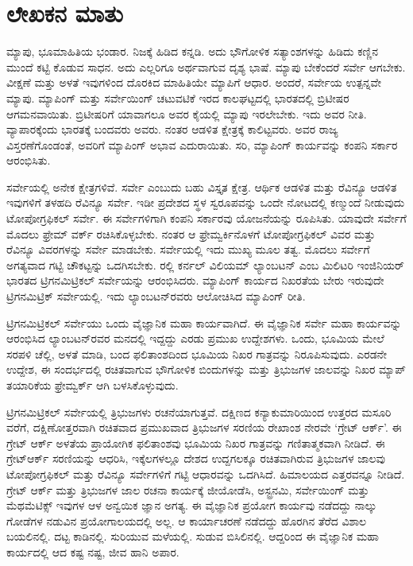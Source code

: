 
\chapter*{ಲೇಖಕನ ಮಾತು}

ಮ್ಯಾಪು, ಭೂಮಾಹಿತಿಯ ಭಂಡಾರ. ನಿಜಕ್ಕೆ ಹಿಡಿದ ಕನ್ನಡಿ. ಅದು ಭೌಗೋಳಿಕ ಸತ್ಯಾಂಶಗಳನ್ನು ಹಿಡಿದು ಕಣ್ಣಿನ ಮುಂದೆ ಕಟ್ಟಿ ಕೊಡುವ ಸಾಧನ. ಅದು ಎಲ್ಲರಿಗೂ ಅರ್ಥವಾಗುವ ದೃಶ್ಯ ಭಾಷೆ. ಮ್ಯಾಪು ಬೇಕೆಂದರೆ ಸರ್ವೇ ಆಗಬೇಕು. ವೀಕ್ಷಣೆ ಮತ್ತು ಅಳತೆ ಇವುಗಳಿಂದ ದೊರಕಿದ ಮಾಹಿತಿಯೇ ಮ್ಯಾಪಿಗೆ ಆಧಾರ. ಅಂದರೆ, ಸರ್ವೇಯ ಉತ್ಪನ್ನವೇ ಮ್ಯಾಪು. ಮ್ಯಾಪಿಂಗ್​ ಮತ್ತು ಸರ್ವೇಯಿಂಗ್​ ಚಟುವಟಿಕೆ ಇರದ ಕಾಲಘಟ್ಟದಲ್ಲಿ ಭಾರತದಲ್ಲಿ ಬ್ರಿಟೀಷರ ಆಗಮನವಾಯಿತು. ಬ್ರಿಟೀಷರಿಗೆ ಯಾವಾಗಲೂ ಅವರ ಕೈಯಲ್ಲಿ ಮ್ಯಾಪು ಇರಲೇಬೇಕು. ಇದು ಅವರ ನೀತಿ. ವ್ಯಾಪಾರಕ್ಕೆಂದು ಭಾರತಕ್ಕೆ ಬಂದವರು ಅವರು. ನಂತರ ಆಡಳಿತ ಕ್ಷೇತ್ರಕ್ಕೆ ಕಾಲಿಟ್ಟವರು. ಅವರ ರಾಜ್ಯ ವಿಸ್ತರಣೆಗೊಂಡಂತೆ, ಅವರಿಗೆ ಮ್ಯಾಪಿಂಗ್​ ಅಭಾವ ಎದುರಾಯಿತು. ಸರಿ, ಮ್ಯಾಪಿಂಗ್​ ಕಾರ್ಯವನ್ನು ಕಂಪನಿ ಸರ್ಕಾರ ಆರಂಭಿಸಿತು.

ಸರ್ವೇಯಲ್ಲಿ ಅನೇಕ ಕ್ಷೇತ್ರಗಳಿವೆ. ಸರ್ವೇ ಎಂಬುದು ಬಹು ವಿಸ್ತೃತ ಕ್ಷೇತ್ರ. ಆರ್ಥಿಕ ಆಡಳಿತ ಮತ್ತು ರೆವಿನ್ಯೂ ಆಡಳಿತ ಇವುಗಳಿಗೆ ತಳಹದಿ ರೆವಿನ್ಯೂ ಸರ್ವೇ. ಇಡೀ ಪ್ರದೇಶದ ಸ್ಥಳ ಸ್ವರೂಪವನ್ನು ಒಂದೇ ನೋಟದಲ್ಲಿ ಕಣ್ಮುಂದೆ ನೀಡುವುದು ಟೋಪೋಗ್ರಫಿಕಲ್​ ಸರ್ವೇ. ಈ ಸರ್ವೇಗಳಿಗಾಗಿ ಕಂಪನಿ ಸರ್ಕಾರವು ಯೋಜನೆಯನ್ನು ರೂಪಿಸಿತು. ಯಾವುದೇ ಸರ್ವೇಗೆ ಮೊದಲು ಫ್ರೇಮ್ ವರ್ಕ್ ರಚಿಸಿಕೊಳ್ಳಬೇಕು. ನಂತರ ಆ ಫ್ರೇಮ್ವರ್ಕಿನೊಳಗೆ ಟೋಪೋಗ್ರಫಿಕಲ್​ ವಿವರ ಮತ್ತು ರೆವಿನ್ಯೂ ವಿವರಗಳನ್ನು ಸರ್ವೇ ಮಾಡಬೇಕು. ಸರ್ವೇಯಲ್ಲಿ ಇದು ಮುಖ್ಯ ಮೂಲ ತತ್ವ. ಮೊದಲು ಸರ್ವೇಗೆ ಅಗತ್ಯವಾದ ಗಟ್ಟಿ ಚೌಕಟ್ಟನ್ನು ಒದಗಿಸಬೇಕು.  ರಲ್ಲಿ ಕರ್ನಲ್​ ವಿಲಿಯಮ್ ಲ್ಯಾಂಬಟನ್​ ಎಂಬ ಮಿಲಿಟರಿ ಇಂಜಿನಿಯರ್​ ಭಾರತದ ಟ್ರಿಗನಮಿಟ್ರಿಕಲ್​ ಸರ್ವೇಯನ್ನು ಆರಂಭಿಸಿದರು. ಮ್ಯಾಪಿಂಗ್​ ಕಾರ್ಯದ ನಿಖರತೆಯ ಬೇರು ಇರುವುದೇ ಟ್ರಿಗನಮಿಟ್ರಿಕ್​ ಸರ್ವೇಯಲ್ಲಿ. ಇದು ಲ್ಯಾಂಬಟನ್​ರವರು ಆಲೋಚಿಸಿದ ಮ್ಯಾಪಿಂಗ್​ ರೀತಿ.

ಟ್ರಿಗನಮಿಟ್ರಿಕಲ್​ ಸರ್ವೇಯು ಒಂದು ವೈಜ್ಞಾನಿಕ ಮಹಾ ಕಾರ್ಯವಾಗಿದೆ. ಈ ವೈಜ್ಞಾನಿಕ ಸರ್ವೇ ಮಹಾ ಕಾರ್ಯವನ್ನು ಆರಂಭಿಸಿದ ಲ್ಯಾಂಬಟನ್​ರವರ ಮನದಲ್ಲಿ ಇದ್ದದ್ದು ಎರಡು ಪ್ರಮುಖ ಉದ್ದೇಶಗಳು. ಒಂದು, ಭೂಮಿಯ ಮೇಲೆ ಸರಪಳಿ ಚೆಲ್ಲಿ, ಅಳತೆ ಮಾಡಿ, ಬಂದ ಫಲಿತಾಂಶದಿಂದ ಭೂಮಿಯ ನಿಖರ ಗಾತ್ರವನ್ನು ನಿರೂಪಿಸುವುದು. ಎರಡನೇ ಉದ್ದೇಶ, ಈ ಸಂದರ್ಭದಲ್ಲಿ ರಚಿತವಾಗುವ ಭೌಗೋಳಿಕ ಬಿಂದುಗಳನ್ನು ಮತ್ತು ತ್ರಿಭುಜಗಳ ಜಾಲವನ್ನು ನಿಖರ ಮ್ಯಾಪ್​ ತಯಾರಿಕೆಯ ಫ್ರೇಮ್ವರ್ಕ್ ಆಗಿ ಬಳಸಿಕೊಳ್ಳುವುದು.

ಟ್ರಿಗನಮಿಟ್ರಿಕಲ್​ ಸರ್ವೇಯಲ್ಲಿ ತ್ರಿಭುಜಗಳು ರಚನೆಯಾಗುತ್ತವೆ. ದಕ್ಷಿಣದ ಕನ್ಯಾಕುಮಾರಿಯಿಂದ ಉತ್ತರದ ಮಸೂರಿ ವರೆಗೆ, ದಕ್ಷಿಣೋತ್ತರವಾಗಿ ರಚಿತವಾದ ಪ್ರಮುಖವಾದ ತ್ರಿಭುಜಗಳ ಸರಣಿಯ ರೇಖಾಂಶ ನೇರವೇ ‘ಗ್ರೇಟ್​ ಆರ್ಕ್’. ಈ ಗ್ರೇಟ್​ ಆರ್ಕ್ ಅಳತೆಯ ಪ್ರಾಯೋಗಿಕ ಫಲಿತಾಂಶವು ಭೂಮಿಯ ನಿಖರ ಗಾತ್ರವನ್ನು ಗಣಿತಾತ್ಮಕವಾಗಿ ನೀಡಿದೆ. ಈ ಗ್ರೇಟ್​ ಆರ್ಕ್ ಸರಣಿಯನ್ನು ಆಧರಿಸಿ, ಇಕ್ಕೆಲಗಳಲ್ಲೂ ದೇಶದ ಉದ್ದಗಲಕ್ಕೂ ರಚಿತವಾಗಿರುವ ತ್ರಿಭುಜಗಳ ಜಾಲವು ಟೋಪೋಗ್ರಫಿಕಲ್​ ಮತ್ತು ರೆವಿನ್ಯೂ ಸರ್ವೇಗಳಿಗೆ ಗಟ್ಟಿ ಆಧಾರವನ್ನು ಒದಗಿಸಿದೆ. ಹಿಮಾಲಯದ ಎತ್ತರವನ್ನೂ ನೀಡಿದೆ. ಗ್ರೇಟ್​ ಆರ್ಕ್ ಮತ್ತು ತ್ರಿಭುಜಗಳ ಜಾಲ ರಚನಾ ಕಾರ್ಯಕ್ಕೆ ಜೀಯೋಡೆಸಿ, ಅಸ್ಟ್ರನಮಿ, ಸರ್ವೇಯಿಂಗ್​ ಮತ್ತು ಮೆಥಮೆಟಿಕ್ಸ್​ ಇವುಗಳ ಆಳ ಅನ್ವಯಿಕ ಜ್ಞಾನ ಅಗತ್ಯ. ಈ ವೈಜ್ಞಾನಿಕ ಪ್ರಯೋಗ ಕಾರ್ಯವು ನಡೆದದ್ದು ನಾಲ್ಕು ಗೋಡೆಗಳ ನಡುವಿನ ಪ್ರಯೋಗಾಲಯದಲ್ಲಿ ಅಲ್ಲ. ಆ ಕಾರ್ಯಾಚರಣೆ ನಡೆದದ್ದು ಹೊರಗಿನ ತೆರೆದ ವಿಶಾಲ ಬಯಲಿನಲ್ಲಿ. ದಟ್ಟ ಕಾಡಿನಲ್ಲಿ. ಸುರಿಯುವ ಮಳೆಯಲ್ಲಿ. ಸುಡುವ ಬಿಸಿಲಿನಲ್ಲಿ. ಆದ್ದರಿಂದ ಈ ವೈಜ್ಞಾನಿಕ ಮಹಾ ಕಾರ್ಯದಲ್ಲಿ ಆದ ಕಷ್ಟ ನಷ್ಟ, ಜೀವ ಹಾನಿ ಅಪಾರ.

